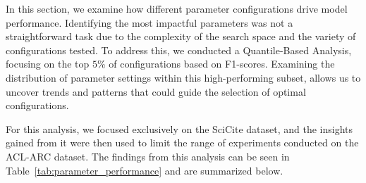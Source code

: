 

In this section, we examine how different parameter configurations drive model performance.
Identifying the most impactful parameters was not a straightforward task due to the complexity of the search space and the variety of configurations tested.
To address this, we conducted a Quantile-Based Analysis, focusing on the top $5$\% of configurations based on F1-scores. 
Examining the distribution of parameter settings within this high-performing subset, allows us to 
uncover trends and patterns that could guide the selection of optimal configurations. 

For this analysis, we focused exclusively on the SciCite dataset, and the insights gained from it were then used to limit the range of experiments conducted on the ACL-ARC dataset.
The findings from this analysis can be seen in Table~\ref{tab:parameter_performance} and are summarized below.


